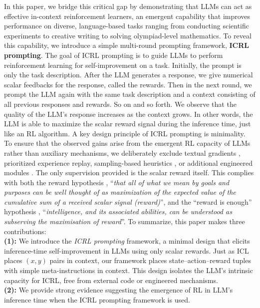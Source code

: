 \documentclass{article}
\newcommand{\0}{\mathbf{0}}
\begin{document}
In this paper, we bridge this critical gap by demonstrating that LLMs can act as effective in-context reinforcement learners, an emergent capability that improves performance on diverse, language-based tasks ranging from conducting scientific experiments to creative writing to solving olympiad-level mathematics. To reveal this capability, we introduce a simple multi-round prompting framework, \textbf{ICRL prompting}.
The goal of ICRL prompting is to guide LLMs to perform reinforcement learning for self-improvement on a task.
Initially,
the prompt is only the task description.
After the LLM generates a response,
we give numerical scalar feedbacks for the response,
called the rewards.
Then in the next round,
we prompt the LLM again with the same task description and a context consisting of all previous responses and rewards.
So on and so forth.
We observe that the quality of the LLM's response increases as the context grows.
In other words,
the LLM is able to maximize the scalar reward signal during the inference time,
just like an RL algorithm.
A key design principle of ICRL prompting is minimality. To ensure that the observed gains arise from the emergent RL capacity of LLMs rather than auxiliary mechanisms, we deliberately exclude textual gradients \citep{textgrad}, prioritized experience replay, sampling-based heuristics \citep{zhang2024edtimprovinglargelanguage, llm_as_optimizers}, or additional engineered modules \citep{brooks2024large}. The only supervision provided is the scalar reward itself. This complies with both the reward hypothesis \citep{reward-hypothesis}, ``\textit{that all of what we mean by goals and purposes can be well thought of as maximization of the expected value of the cumulative sum of a received scalar signal (reward)}'',  and the ``reward is enough'' hypothesis \citep{reward-is-enough}, ``\textit{intelligence, and its associated abilities, can be understood as subserving the maximisation of reward}''.
To summarize,
this paper makes three contributions: \\
\textbf{(1):} We introduce the \emph{ICRL prompting} framework, a minimal design that elicits inference-time self-improvement in LLMs using only scalar rewards. Just as ICL places $(x, y)$ pairs in context, our framework places state–action–reward tuples with simple meta-instructions in context. This design isolates the LLM’s intrinsic capacity for ICRL, free from external code or engineered mechanisms. \\
\textbf{(2):} We provide strong evidence suggesting the emergence of RL in LLM's inference time when the ICRL prompting framework is used.
\end{document}
